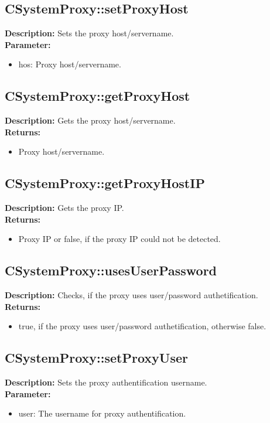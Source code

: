 \subsection{CSystemProxy::setProxyHost}
\textbf{Description:} Sets the proxy host/servername.\\
\textbf{Parameter:}
\begin{itemize}
\item hos: Proxy host/servername.
\end{itemize}

\subsection{CSystemProxy::getProxyHost}
\textbf{Description:} Gets the proxy host/servername.\\
\textbf{Returns:}
\begin{itemize}
\item Proxy host/servername.
\end{itemize}

\subsection{CSystemProxy::getProxyHostIP}
\textbf{Description:} Gets the proxy IP.\\
\textbf{Returns:}
\begin{itemize}
\item Proxy IP or false, if the proxy IP could not be detected.
\end{itemize}

\subsection{CSystemProxy::usesUserPassword}
\textbf{Description:} Checks, if the proxy uses user/password authetification.\\
\textbf{Returns:}
\begin{itemize}
\item true, if the proxy uses user/password authetification, otherwise false.
\end{itemize}

\subsection{CSystemProxy::setProxyUser}
\textbf{Description:} Sets the proxy authentification username.\\
\textbf{Parameter:}
\begin{itemize}
\item user: The username for proxy authentification.
\end{itemize}

